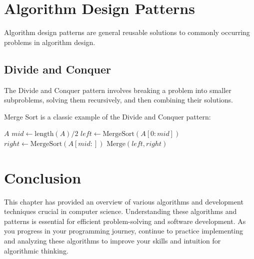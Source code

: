 \section{Algorithm Design Patterns}

Algorithm design patterns are general reusable solutions to commonly
occurring problems in algorithm design.

\subsection{Divide and Conquer}

The Divide and Conquer pattern involves breaking a problem into smaller
subproblems, solving them recursively, and then combining their
solutions.

\begin{example}
Merge Sort is a classic example of the Divide and Conquer pattern:

\begin{algorithmic}
        \RETURN $A$
    \ENDIF
    \STATE $mid \gets \text{length}(A) / 2$
    \STATE $left \gets \text{MergeSort}(A[0:mid])$
    \STATE $right \gets \text{MergeSort}(A[mid:])$
    \RETURN $\text{Merge}(left, right)$
\ENDPROCEDURE
\end{algorithmic}
\end{example}

\section{Conclusion}

This chapter has provided an overview of various algorithms and
development techniques crucial in computer science. Understanding these
algorithms and patterns is essential for efficient problem-solving and
software development. As you progress in your programming journey,
continue to practice implementing and analyzing these algorithms to
improve your skills and intuition for algorithmic thinking.


